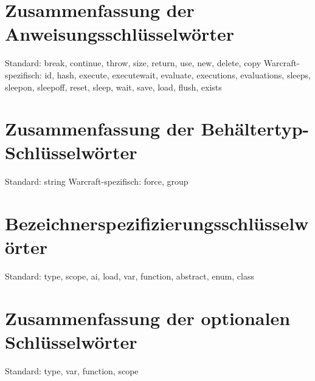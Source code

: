 \section{Zusammenfassung der Anweisungsschlüsselwörter}
Standard: break, continue, throw, size, return, use, new, delete, copy
Warcraft-spezifisch: id, hash, execute, executewait, evaluate, executions, evaluations, sleeps, sleepon, sleepoff, reset, sleep, wait, save, load, flush, exists

\section{Zusammenfassung der Behältertyp-Schlüsselwörter}
Standard: string
Warcraft-spezifisch: force, group

\section{Bezeichnerspezifizierungsschlüsselwörter}
Standard: type, scope, ai, load, var, function, abstract, enum, class

\section{Zusammenfassung der optionalen Schlüsselwörter}
Standard: type, var, function, scope
